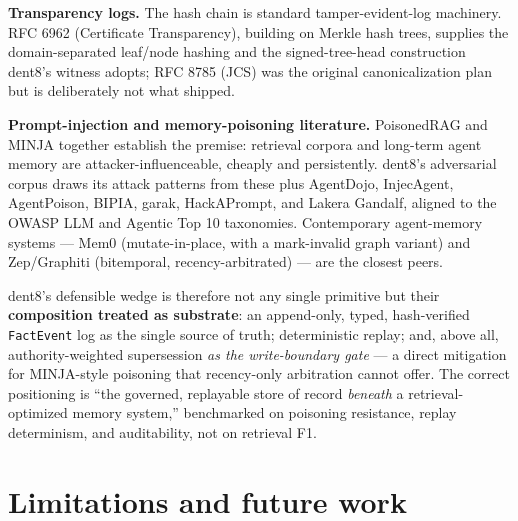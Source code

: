 \documentclass[11pt]{article}
\newcommand{\code}[1]{\texttt{#1}}
\begin{document}
\textbf{Transparency logs.} The hash chain is standard tamper-evident-log machinery. RFC 6962 (Certificate Transparency), building on Merkle hash trees, supplies the domain-separated leaf/node hashing and the signed-tree-head construction dent8's witness adopts; RFC 8785 (JCS) was the original canonicalization plan but is deliberately not what shipped.

\textbf{Prompt-injection and memory-poisoning literature.} PoisonedRAG and MINJA together establish the premise: retrieval corpora and long-term agent memory are attacker-influenceable, cheaply and persistently. dent8's adversarial corpus draws its attack patterns from these plus AgentDojo, InjecAgent, AgentPoison, BIPIA, garak, HackAPrompt, and Lakera Gandalf, aligned to the OWASP LLM and Agentic Top 10 taxonomies. Contemporary agent-memory systems --- Mem0 (mutate-in-place, with a mark-invalid graph variant) and Zep/Graphiti (bitemporal, recency-arbitrated) --- are the closest peers.

dent8's defensible wedge is therefore not any single primitive but their \textbf{composition treated as substrate}: an append-only, typed, hash-verified \code{FactEvent} log as the single source of truth; deterministic replay; and, above all, authority-weighted supersession \emph{as the write-boundary gate} --- a direct mitigation for MINJA-style poisoning that recency-only arbitration cannot offer. The correct positioning is ``the governed, replayable store of record \emph{beneath} a retrieval-optimized memory system,'' benchmarked on poisoning resistance, replay determinism, and auditability, not on retrieval F1.

\section{Limitations and future work}
\end{document}
